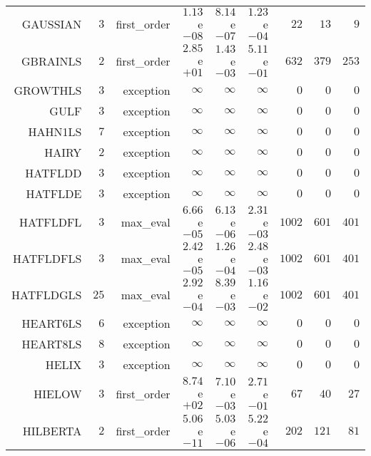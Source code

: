 \begin{longtable}{rrrrrrrrr}
GAUSSIAN & \(     3\) & first\_order & \( 1.13\)e\(-08\) & \( 8.14\)e\(-07\) & \( 1.23\)e\(-04\) & \(    22\) & \(    13\) & \(     9\) \\
GBRAINLS & \(     2\) & first\_order & \( 2.85\)e\(+01\) & \( 1.43\)e\(-03\) & \( 5.11\)e\(-01\) & \(   632\) & \(   379\) & \(   253\) \\
GROWTHLS & \(     3\) & exception & \(\infty\) & \(\infty\) & \(\infty\) & \(     0\) & \(     0\) & \(     0\) \\
GULF & \(     3\) & exception & \(\infty\) & \(\infty\) & \(\infty\) & \(     0\) & \(     0\) & \(     0\) \\
HAHN1LS & \(     7\) & exception & \(\infty\) & \(\infty\) & \(\infty\) & \(     0\) & \(     0\) & \(     0\) \\
HAIRY & \(     2\) & exception & \(\infty\) & \(\infty\) & \(\infty\) & \(     0\) & \(     0\) & \(     0\) \\
HATFLDD & \(     3\) & exception & \(\infty\) & \(\infty\) & \(\infty\) & \(     0\) & \(     0\) & \(     0\) \\
HATFLDE & \(     3\) & exception & \(\infty\) & \(\infty\) & \(\infty\) & \(     0\) & \(     0\) & \(     0\) \\
HATFLDFL & \(     3\) & max\_eval & \( 6.66\)e\(-05\) & \( 6.13\)e\(-06\) & \( 2.31\)e\(-03\) & \(  1002\) & \(   601\) & \(   401\) \\
HATFLDFLS & \(     3\) & max\_eval & \( 2.42\)e\(-05\) & \( 1.26\)e\(-04\) & \( 2.48\)e\(-03\) & \(  1002\) & \(   601\) & \(   401\) \\
HATFLDGLS & \(    25\) & max\_eval & \( 2.92\)e\(-04\) & \( 8.39\)e\(-03\) & \( 1.16\)e\(-02\) & \(  1002\) & \(   601\) & \(   401\) \\
HEART6LS & \(     6\) & exception & \(\infty\) & \(\infty\) & \(\infty\) & \(     0\) & \(     0\) & \(     0\) \\
HEART8LS & \(     8\) & exception & \(\infty\) & \(\infty\) & \(\infty\) & \(     0\) & \(     0\) & \(     0\) \\
HELIX & \(     3\) & exception & \(\infty\) & \(\infty\) & \(\infty\) & \(     0\) & \(     0\) & \(     0\) \\
HIELOW & \(     3\) & first\_order & \( 8.74\)e\(+02\) & \( 7.10\)e\(-03\) & \( 2.71\)e\(-01\) & \(    67\) & \(    40\) & \(    27\) \\
HILBERTA & \(     2\) & first\_order & \( 5.06\)e\(-11\) & \( 5.03\)e\(-06\) & \( 5.22\)e\(-04\) & \(   202\) & \(   121\) & \(    81\) \\

\end{longtable}
